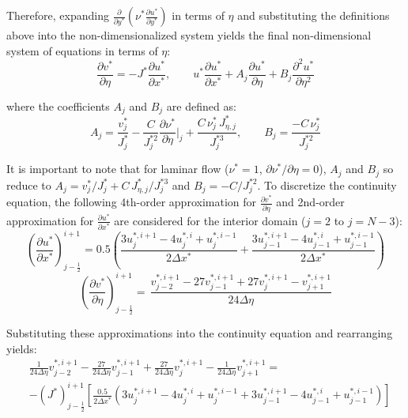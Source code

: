 \documentclass[letterpaper,12pt]{article}
\begin{document}
Therefore, expanding $\frac{\partial}{\partial y^*}\left(\nu^* \frac{\partial u^*}{\partial y^*}\right)$ in terms of $\eta$ and substituting the definitions above into the non-dimensionalized system yields the final non-dimensional system of equations in terms of  $\eta$:
\begin{equation}
    \frac{\partial v^*}{\partial \eta} = -J^* \frac{\partial u^*}{\partial x^*}, \qquad u^* \frac{\partial u^*}{\partial x^*} + A_j \frac{\partial u^*}{\partial \eta} + B_j \frac{\partial^2 u^*}{\partial \eta^2}
\end{equation}

where the coefficients $A_j$ and $B_j$ are defined as:
\begin{equation}
A_j = \frac{v^*_j}{J^*_j} - \frac{C}{J^{*2}_j}\frac{\partial \nu^*}{\partial \eta}\bigg|_j + \frac{C\,\nu^*_j\, J^*_{\eta,j}}{J^{*3}_j}, \qquad B_j = \frac{-C\,\nu^*_j}{J^{*2}_j}
\end{equation}

It is important to note that for laminar flow ($\nu^* = 1$, $\partial\nu^*/\partial\eta = 0$), $A_j$ and $B_j$ so reduce to $A_j = v^*_j/J^*_j + C\,J^*_{\eta,j}/J^{*3}_j$ and $B_j = -C/J^{*2}_j$. To discretize the continuity equation, the following 4th-order approximation for $\frac{\partial v^*}{\partial \eta}$ and 2nd-order approximation for $\frac{\partial u^*}{\partial x^*}$ are considered for the interior domain ($j=2$ to $j=N-3$):
\begin{equation}
    \left( \frac{\partial u^*}{\partial x^*} \right)^{i+1}_{j-\frac{1}{2}} = 0.5 \left( \frac{3 u_{j}^{*,i+1} - 4 u_{j}^{*,i} + u_{j}^{*,i-1}}{2 \Delta x^*} + \frac{3 u_{j-1}^{*,i+1} - 4 u_{j-1}^{*,i} + u_{j-1}^{*,i-1}}{2 \Delta x^*}  \right)
\end{equation}
\begin{equation}
    \left( \frac{\partial v^*}{\partial \eta} \right)^{i+1}_{j-\frac{1}{2}} = \frac{}{}\frac{v_{j-2}^{*,i+1} -27 v_{j-1}^{*,i+1} + 27 v_{j}^{*,i+1} - v_{j+1}^{*,i+1}}{24 \Delta \eta}
\end{equation}

Substituting these approximations into the continuity equation and rearranging yields:
\begin{equation}
\begin{aligned}
    &\frac{1}{24 \Delta \eta} v_{j-2}^{*,i+1} - \frac{27}{24 \Delta \eta} v_{j-1}^{*,i+1} + \frac{27}{24 \Delta \eta} v_{j}^{*,i+1} - \frac{1}{24 \Delta \eta} v_{j+1}^{*,i+1} = \\
    & - \left(J^* \right)^{i+1}_{j-\frac{1}{2}} \left[ \frac{0.5}{2 \Delta x^*} \left( 3u_{j}^{*,i+1} - 4 u_{j}^{*,i} + u_{j}^{*,i-1} + 3 u_{j-1}^{*,i+1} - 4 u_{j-1}^{*,i} + u_{j-1}^{*,i-1} \right) \right]
\end{aligned}
\end{equation}
\end{document}
